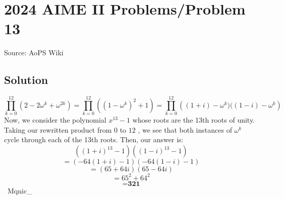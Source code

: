 \documentclass[12pt]{article}
\begin{document}
\section*{{2024 AIME II Problems/Problem 13}}
Source: AoPS Wiki

\subsection*{Solution}
\[\prod_{k=0}^{12} \left(2- 2\omega^k + \omega^{2k}\right) = \prod_{k=0}^{12} \left((1 - \omega^k)^2 + 1\right) = \prod_{k=0}^{12} \left((1 + i) - \omega^k)((1 - i) - \omega^k\right)\] Now, we consider the polynomial $x^{13} - 1$ whose roots are the 13th roots of unity. Taking our rewritten product from $0$ to $12$ , we see that both instances of $\omega^k$ cycle through each of the 13th roots. Then, our answer is: \[((1 + i)^{13} - 1)((1 - i)^{13} - 1)\] \[= (-64(1 + i) - 1)(-64(1 - i) - 1)\] \[= (65 + 64i)(65 - 64i)\] \[= 65^2 + 64^2\] \[= \boxed{\textbf{321}}\] ~Mqnic_
\end{document}
